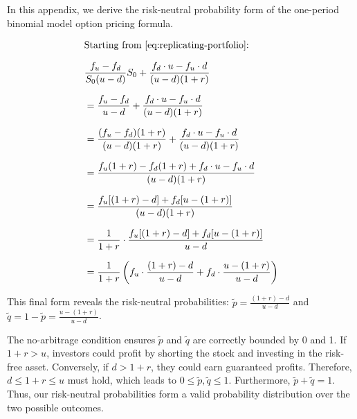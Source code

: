\documentclass[english,12pt,a4paper,pdftex,sci,utf8]{aaltothesis}
\begin{document}
In this appendix, we derive the risk-neutral probability form of the one-period binomial model option pricing formula.

\begin{align}
&\text{Starting from \eqref{eq:replicating-portfolio}:} \nonumber\\[0.7em]
&\frac{f_u - f_d}{S_0(u-d)}S_0 + \frac{f_d \cdot u-f_u \cdot d}{(u-d)(1+r)} \nonumber\\[0.7em]
&=\frac{f_u - f_d}{u-d} + \frac{f_d \cdot u-f_u \cdot d}{(u-d)(1+r)} \nonumber\\[0.7em]
&=\frac{(f_u - f_d)(1+r)}{(u-d)(1+r)} + \frac{f_d \cdot u - f_u \cdot d}{(u-d)(1+r)} \nonumber\\[0.7em]
&=\frac{f_u(1+r) - f_d(1+r) + f_d \cdot u - f_u \cdot d}{(u-d)(1+r)} \nonumber\\[0.7em]
&= \frac{f_u[(1+r) - d] + f_d[u - (1+r)]}{(u-d)(1+r)} \nonumber\\[0.7em]
&= \frac{1}{1+r} \cdot \frac{f_u[(1+r) - d] + f_d[u - (1+r)]}{u-d} \nonumber\\[0.7em]
&= \frac{1}{1+r} \left( f_u \cdot \frac{(1+r) - d}{u-d} + f_d \cdot \frac{u - (1+r)}{u-d} \right)\nonumber
\end{align}

This final form reveals the risk-neutral probabilities: $\tilde p = \frac{(1+r) - d}{u-d}$ and $\tilde q = 1-\tilde p = \frac{u - (1+r)}{u-d}$.

The no-arbitrage condition ensures $\tilde p$ and $\tilde q$ are correctly bounded by 0 and 1. If $1+r > u$, investors could profit by shorting the stock and investing in the risk-free asset. Conversely, if $d > 1+r$, they could earn guaranteed profits. Therefore, $d \leq 1+r \leq u$ must hold, which leads to $0\leq \tilde p, \tilde q \leq 1$. Furthermore, $\tilde p + \tilde q = 1$. Thus, our risk-neutral probabilities form a valid probability distribution over the two possible outcomes.






\end{document}
